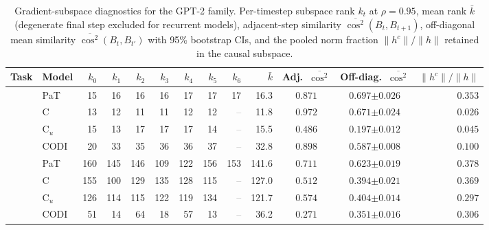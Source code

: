 \begin{table}[h!]
\centering
\small
\setlength{\tabcolsep}{2.5pt}
\caption{Gradient-subspace diagnostics for the GPT-2 family. Per-timestep subspace rank $k_t$ at $\rho{=}0.95$, mean rank $\bar k$ (degenerate final step excluded for recurrent models), adjacent-step similarity $\overline{\cos^2}(B_t, B_{t+1})$, off-diagonal mean similarity $\overline{\cos^2}(B_t, B_{t'})$ with 95\% bootstrap CIs, and the pooled norm fraction $\|h^c\|/\|h\|$ retained in the causal subspace.}
\label{tab:subspace_geometry_gpt2}
\begin{tabular}{llrrrrrrrrccr}
\toprule
Task & Model & $k_{0}$ & $k_{1}$ & $k_{2}$ & $k_{3}$ & $k_{4}$ & $k_{5}$ & $k_{6}$ & $\bar k$ & Adj.\ $\overline{\cos^2}$ & Off-diag.\ $\overline{\cos^2}$ & $\|h^c\|/\|h\|$ \\
\midrule
{} & PaT & 15 & 16 & 16 & 16 & 17 & 17 & 17 & 16.3 & $0.871$ & $0.697 {\scriptstyle \pm 0.026}$ & $0.353$ \\
 & C & 13 & 12 & 11 & 11 & 12 & 12 & \textcolor{gray}{--} & 11.8 & $0.972$ & $0.671 {\scriptstyle \pm 0.024}$ & $0.026$ \\
 & C$_u$ & 15 & 13 & 17 & 17 & 17 & 14 & \textcolor{gray}{--} & 15.5 & $0.486$ & $0.197 {\scriptstyle \pm 0.012}$ & $0.045$ \\
 & CODI & 20 & 33 & 35 & 36 & 36 & 37 & \textcolor{gray}{--} & 32.8 & $0.898$ & $0.587 {\scriptstyle \pm 0.008}$ & $0.100$ \\
\midrule
{} & PaT & 160 & 145 & 146 & 109 & 122 & 156 & 153 & 141.6 & $0.711$ & $0.623 {\scriptstyle \pm 0.019}$ & $0.378$ \\
 & C & 155 & 100 & 129 & 135 & 128 & 115 & \textcolor{gray}{--} & 127.0 & $0.512$ & $0.394 {\scriptstyle \pm 0.021}$ & $0.369$ \\
 & C$_u$ & 126 & 114 & 115 & 122 & 119 & 134 & \textcolor{gray}{--} & 121.7 & $0.574$ & $0.404 {\scriptstyle \pm 0.014}$ & $0.297$ \\
 & CODI & 51 & 14 & 64 & 18 & 57 & 13 & \textcolor{gray}{--} & 36.2 & $0.271$ & $0.351 {\scriptstyle \pm 0.016}$ & $0.306$ \\
\bottomrule
\end{tabular}
\end{table}